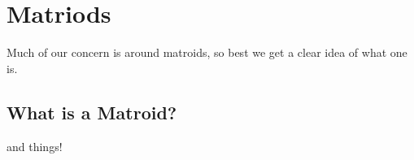 \documentclass[12pt,oneside]{../../sfsuthesis}
\begin{document}
\chapter{Matriods}

Much of our concern is around matroids, so best we get a clear idea of what one is.

\section{What is a Matroid?}


and things!
\end{document}
